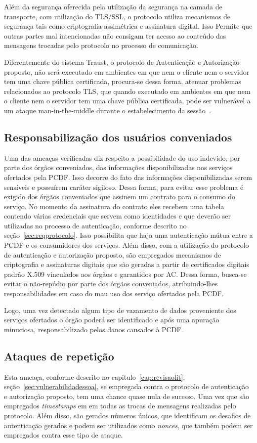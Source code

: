 Além da segurança oferecida pela utilização da segurança na camada de transporte, com utilização do TLS/SSL, o protocolo utiliza mecanismos de segurança tais como criptografia assimétrica e assinatura digital. Isso Permite que outras partes mal intencionadas não consigam ter acesso ao conteúdo das mensagens trocadas pelo protocolo no processo de comunicação.

Diferentemente do sistema Traust, o protocolo de Autenticação e Autorização proposto, não será executado em ambientes em que nem o cliente nem o servidor tem uma chave pública certificada, procura-se dessa forma, atenuar problemas relacionados ao protocolo TLS, que quando executado em ambientes em que nem o cliente nem o servidor tem uma chave pública certificada, pode ser vulnerável a um ataque man-in-the-middle durante o estabelecimento da sessão~\cite{traust08}.

\subsection{Responsabilização dos usuários conveniados}

Uma das ameaças verificadas diz respeito a possibilidade do uso indevido, por parte dos órgãos conveniados, das informações disponibilizadas nos serviços ofertados pela PCDF. Isso decorre do fato das informações disponibilizadas serem sensíveis e possuírem caráter sigiloso. Dessa forma, para evitar esse problema é exigido dos órgãos conveniados que assinem um contrato para o consumo do serviço. No momento da assinatura do contrato eles recebem uma tabela contendo várias credenciais que servem como identidades e que deverão ser utilizadas no processo de autenticação, conforme descrito no seção~\ref{sec:reqprotocolo}. Isso possibilita que haja uma autenticação mútua entre a PCDF e os consumidores dos serviços. Além disso, com a utilização do protocolo de autenticação e autorização proposto, são empregados mecanismos de criptografia e assinaturas digitais que são geradas a partir de certificados digitais padrão X.509 vinculados aos órgãos e garantidos por AC. Dessa forma, busca-se evitar o não-repúdio por parte dos órgãos conveniados, atribuindo-lhes responsabilidades em caso do mau uso dos serviço ofertados pela PCDF.

Logo, uma vez detectado algum tipo de vazamento de dados proveniente dos serviços ofertados o órgão poderá ser identificado e após uma apuração minuciosa, responsabilizado pelos danos causados à PCDF.

\subsection{Ataques de repetição}
Esta ameaça, conforme descrito no capitulo~\ref{cap:revisaolit}, seção~\ref{sec:vulnerabilidadessoa}, se empregada contra o protocolo de autenticação e autorização proposto, tem uma chance quase nula de sucesso. Uma vez que são empregados \emph{timestamps} em em todas as trocas de mensagens realizadas pelo protocolo. Além disso, são gerados números únicos, que identificam os desafios de autenticação gerados e podem ser utilizados como \emph{nonces}, que também podem ser empregados contra esse tipo de ataque.

